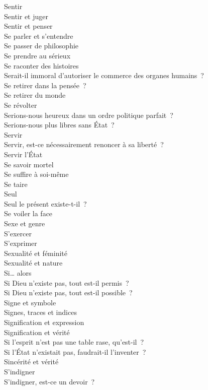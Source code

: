 \documentclass[a4paper,12pt]{article}
\begin{document}
Sentir \\
Sentir et juger \\
Sentir et penser \\
Se parler et s'entendre \\
Se passer de philosophie \\
Se prendre au sérieux \\
Se raconter des histoires \\
Serait-il immoral d'autoriser le commerce des organes humains ? \\
Se retirer dans la pensée ? \\
Se retirer du monde \\
Se révolter \\
Serions-nous heureux dans un ordre politique parfait ? \\
Serions-nous plus libres sans État ? \\
Servir \\
Servir, est-ce nécessairement renoncer à sa liberté ? \\
Servir l'État \\
Se savoir mortel \\
Se suffire à soi-même \\
Se taire \\
Seul \\
Seul le présent existe-t-il ? \\
Se voiler la face \\
Sexe et genre \\
S'exercer \\
S'exprimer \\
Sexualité et féminité \\
Sexualité et nature \\
Si\ldots{} alors \\
Si Dieu n'existe pas, tout est-il permis ? \\
Si Dieu n'existe pas, tout est-il possible ? \\
Signe et symbole \\
Signes, traces et indices \\
Signification et expression \\
Signification et vérité \\
Si l'esprit n'est pas une table rase, qu'est-il ? \\
Si l'État n'existait pas, faudrait-il l'inventer ? \\
Sincérité et vérité \\
S'indigner \\
S'indigner, est-ce un devoir ? \\
\end{document}
